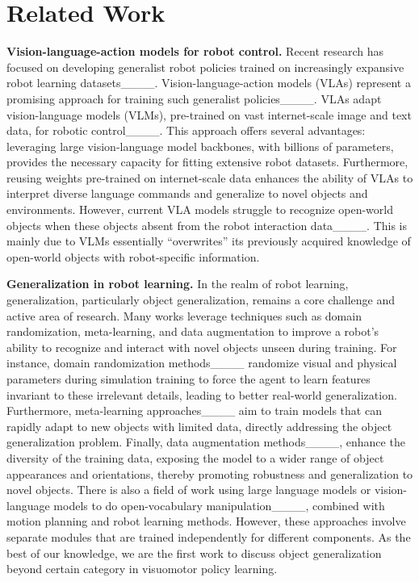 \section{Related Work}
\textbf{Vision-language-action models for robot control.} Recent research has focused on developing generalist robot policies trained on increasingly expansive robot learning datasets____. Vision-language-action models (VLAs) represent a promising approach for training such generalist policies____. VLAs adapt vision-language models (VLMs), pre-trained on vast internet-scale image and text data, for robotic control____. This approach offers several advantages: leveraging large vision-language model backbones, with billions of parameters, provides the necessary capacity for fitting extensive robot datasets. Furthermore, reusing weights pre-trained on internet-scale data enhances the ability of VLAs to interpret diverse language commands and generalize to novel objects and environments. However, current VLA models struggle to  recognize open-world objects when these objects absent from the robot interaction data____. This is mainly due to VLMs essentially “overwrites” its previously acquired knowledge of open-world objects with robot-specific information.

\noindent
\textbf{Generalization in robot learning.} 
In the realm of robot learning, generalization, particularly object generalization, remains a core challenge and active area of research. Many works leverage techniques such as domain randomization, meta-learning, and data augmentation to improve a robot's ability to recognize and interact with novel objects unseen during training. For instance, domain randomization methods____ randomize visual and physical parameters during simulation training to force the agent to learn features invariant to these irrelevant details, leading to better real-world generalization.  Furthermore, meta-learning approaches____ aim to train models that can rapidly adapt to new objects with limited data, directly addressing the object generalization problem. Finally, data augmentation methods____, enhance the diversity of the training data, exposing the model to a wider range of object appearances and orientations, thereby promoting robustness and generalization to novel objects. There is also a field of work using large language models or vision-language models to do open-vocabulary manipulation____, combined with motion planning and robot learning methods. However, these approaches involve separate modules that are trained independently for different components. As the best of our knowledge, we are the first work to discuss object generalization beyond certain category in visuomotor policy learning.